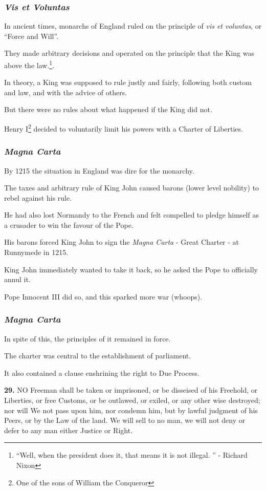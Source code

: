 \begin{frame}
\frametitle{\textit{Vis et Voluntas}}

In ancient times, monarchs of England ruled on the principle of \textit{vis et voluntas}, or ``Force and Will''.

They made arbitrary decisions and operated on the principle that the King was above the law.\footnote{``Well, when the president does it, that means it is not illegal.
'' - Richard Nixon}.

In theory, a King was supposed to rule justly and fairly, following both custom and law, and with the advice of others.

But there were no rules about what happened if the King did not.

Henry I\footnote{One of the sons of William the Conqueror} decided to voluntarily limit his powers with a Charter of Liberties.

\end{frame}



\begin{frame}
\frametitle{\textit{Magna Carta}}

By 1215 the situation in England was dire for the monarchy.

The taxes and arbitrary rule of King John caused barons (lower level nobility) to rebel against his rule.

He had also lost Normandy to the French and felt compelled to pledge himself as a crusader to win the favour of the Pope.

His barons forced King John to sign the \textit{Magna Carta} - Great Charter - at Runnymede in 1215.

King John immediately wanted to take it back, so he asked the Pope to officially annul it. 

Pope Innocent III did so, and this sparked more war (whoops).

\end{frame}



\begin{frame}
\frametitle{\textit{Magna Carta}}

In spite of this, the principles of it remained in force.

The charter was central to the establishment of parliament.

It also contained a clause enshrining the right to Due Process.

\textbf{29.} NO Freeman shall be taken or imprisoned,
	or be disseised of his Freehold, or
	Liberties, or free Customs, or be outlawed,
	or exiled, or any other wise destroyed; nor 
	will We not pass upon him, nor condemn 
	him, but by lawful judgment of his Peers,
	or by the Law of the land. We will sell to no
	man, we will not deny or defer to any man 
	either Justice or Right.

\end{frame}



